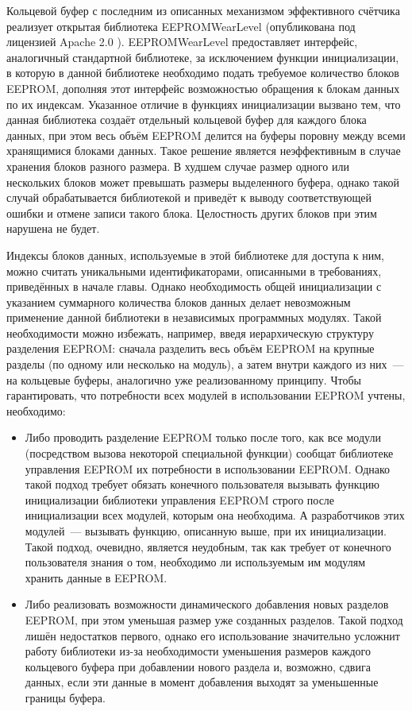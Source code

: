 Кольцевой буфер с последним из описанных механизмом эффективного счётчика реализует открытая библиотека EEPROMWearLevel \cite{web:eeprom-wear-level} (опубликована под лицензией Apache 2.0 \cite{web:apache-license-2.0}).
EEPROMWearLevel предоставляет интерфейс, аналогичный стандартной библиотеке, за исключением функции инициализации, в которую в данной библиотеке необходимо подать требуемое количество блоков EEPROM, дополняя этот интерфейс возможностью обращения к блокам данных по их индексам.
Указанное отличие в функциях инициализации вызвано тем, что данная библиотека создаёт отдельный кольцевой буфер для каждого блока данных, при этом весь объём EEPROM делится на буферы поровну между всеми хранящимися блоками данных.
Такое решение является неэффективным в случае хранения блоков разного размера.
В худшем случае размер одного или нескольких блоков может превышать размеры выделенного буфера, однако такой случай обрабатывается библиотекой и приведёт к выводу соответствующей ошибки и отмене записи такого блока.
Целостность других блоков при этим нарушена не будет.

Индексы блоков данных, используемые в этой библиотеке для доступа к ним, можно считать уникальными идентификаторами, описанными в требованиях, приведённых в начале главы.
Однако необходимость общей инициализации с указанием суммарного количества блоков данных делает невозможным применение данной библиотеки в независимых программных модулях.
Такой необходимости можно избежать, например, введя иерархическую структуру разделения EEPROM: сначала разделить весь объём EEPROM на крупные разделы (по одному или несколько на модуль), а затем внутри каждого из них~--- на кольцевые буферы, аналогично уже реализованному принципу.
Чтобы гарантировать, что потребности всех модулей в использовании EEPROM учтены, необходимо:
\begin{itemize}
	\item Либо проводить разделение EEPROM только после того, как все модули (посредством вызова некоторой специальной функции) сообщат библиотеке управления EEPROM их потребности в использовании EEPROM. Однако такой подход требует обязать конечного пользователя вызывать функцию инициализации библиотеки управления EEPROM строго после инициализации всех модулей, которым она необходима. А разработчиков этих модулей~--- вызывать функцию, описанную выше, при их инициализации. Такой подход, очевидно, является неудобным, так как требует от конечного пользователя знания о том, необходимо ли используемым им модулям хранить данные в EEPROM.
	\item Либо реализовать возможности динамического добавления новых разделов EEPROM, при этом уменьшая размер уже созданных разделов. Такой подход лишён недостатков первого, однако его использование значительно усложнит работу библиотеки из-за необходимости уменьшения размеров каждого кольцевого буфера при добавлении нового раздела и, возможно, сдвига данных, если эти данные в момент добавления выходят за уменьшенные границы буфера.
\end{itemize}

